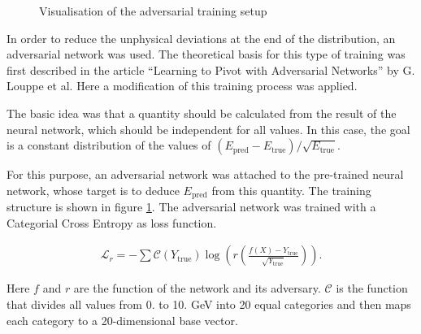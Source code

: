 \documentclass[12pt, a4paper]{thesis}
\begin{document}
\begin{figure}[h]
\caption{Visualisation of the adversarial training setup}
\label{adv-training}
\end{figure}

In order to reduce the unphysical deviations at the end of the
distribution, an adversarial network was used. The theoretical basis
for this type of training was first described in the article ``Learning
to Pivot with Adversarial Networks'' by G. Louppe et al. Here a
modification of this training process was applied.

The basic idea was that a quantity should be calculated from the
result of the neural network, which should be independent for all
values. In this case, the goal is a constant distribution of the
values of
\((E_{\text{pred}}-E_{\text{true}})/\sqrt{E_{\text{true}}}\). 

For this purpose, an adversarial network was attached to the
pre-trained neural network, whose target is to deduce
\(E_{\text{pred}}\) from this quantity. The training structure is shown
in figure \ref{adv-training}. The adversarial network was trained
with a Categorial Cross Entropy as loss function.

\begin{align}
\mathcal{L}_r = - \sum \mathcal{C}\left(Y_{\text{true}}\right) \log(r\left(\frac{f(X)-Y_{\text{true}}}{\sqrt{Y_{\text{true}}}}\right)).
\end{align}

Here \(f\) and \(r\) are the function of the network and its
adversary. \(\mathcal{C}\) is the function that divides all values
from 0. to 10. GeV into 20 equal categories and then maps each
category to a 20-dimensional base vector.
\end{document}
